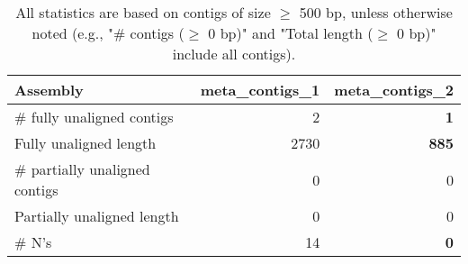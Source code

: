 \documentclass[12pt,a4paper]{article}
\begin{document}
\begin{table}[ht]
\begin{center}
\caption{All statistics are based on contigs of size $\geq$ 500 bp, unless otherwise noted (e.g., "\# contigs ($\geq$ 0 bp)" and "Total length ($\geq$ 0 bp)" include all contigs).}
\begin{tabular}{|l*{2}{|r}|}
\hline
Assembly & meta\_contigs\_1 & meta\_contigs\_2 \\ \hline
\# fully unaligned contigs & 2 & {\bf 1} \\ \hline
Fully unaligned length & 2730 & {\bf 885} \\ \hline
\# partially unaligned contigs & 0 & 0 \\ \hline
Partially unaligned length & 0 & 0 \\ \hline
\# N's & 14 & {\bf 0} \\ \hline
\end{tabular}
\end{center}
\end{table}
\end{document}
